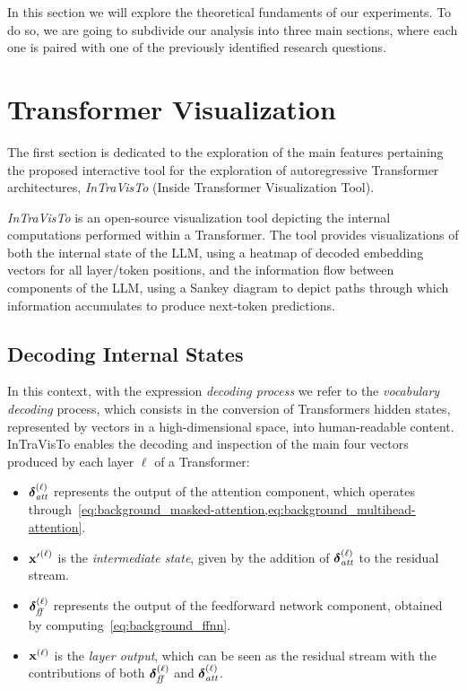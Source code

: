 In this section we will explore the theoretical fundaments of our experiments.
To do so, we are going to subdivide our analysis into three main sections, where each one is paired with one of the previously identified research questions.

\section{Transformer Visualization}\label{sec:method_intravisto}

The first section is dedicated to the exploration of the main features pertaining the proposed interactive tool for the exploration of autoregressive Transformer architectures, \emph{InTraVisTo} (Inside Transformer Visualization Tool).

\emph{InTraVisTo} is an open-source visualization tool depicting the internal computations performed within a Transformer.
The tool provides visualizations of both the internal state of the LLM, using a heatmap of decoded embedding vectors for all layer/token positions, and the information flow between components of the LLM, using a Sankey diagram to depict paths through which information accumulates to produce next-token predictions.

\subsection{Decoding Internal States}\label{ssec:method_intravisto_decoding}

In this context, with the expression \emph{decoding process} we refer to the \emph{vocabulary decoding} process, which consists in the conversion of Transformers hidden states, represented by vectors in a high-dimensional space, into human-readable content.
InTraVisTo enables the decoding and inspection of the main four vectors produced by each layer $\ell$ of a Transformer:
\begin{itemize}
    \item $\bm{\mathbf{\delta}}_\textit{att}^{(\ell)}$ represents the output of the attention component, which operates through~\cref{eq:background_masked-attention,eq:background_multihead-attention}.
    \item ${\bm{\mathbf{x}}'}^{(\ell)}$ is the \emph{intermediate state}, given by the addition of $\bm{\mathbf{\delta}}_\textit{att}^{(\ell)}$ to the residual stream.
    \item $\bm{\mathbf{\delta}}_\textit{ff}^{(\ell)}$ represents the output of the feedforward network component, obtained by computing~\cref{eq:background_ffnn}.
    \item $\bm{\mathbf{x}}^{(\ell)}$ is the \emph{layer output}, which can be seen as the residual stream with the contributions of both $\bm{\mathbf{\delta}}_\textit{ff}^{(\ell)}$ and $\bm{\mathbf{\delta}}_\textit{att}^{(\ell)}$.
\end{itemize}

